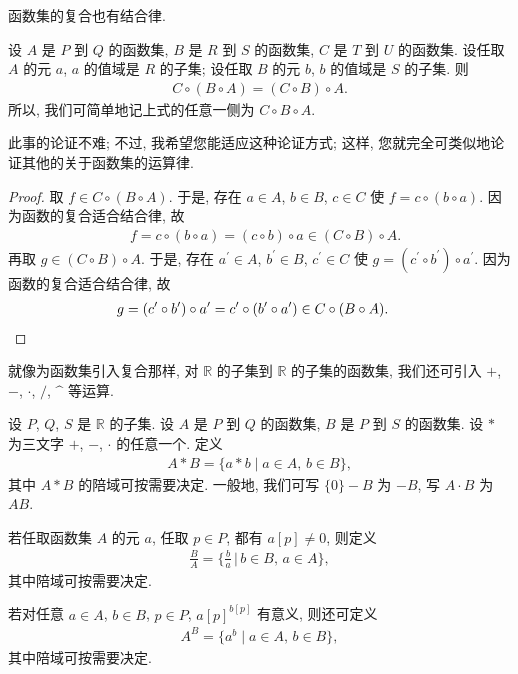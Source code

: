 函数集的复合也有结合律.

\begin{theorem}
    设 $A$ 是 $P$ 到 $Q$ 的函数集,
    $B$ 是 $R$ 到 $S$ 的函数集,
    $C$ 是 $T$ 到 $U$ 的函数集.
    设任取 $A$ 的元 $a$, $a$ 的值域是 $R$ 的子集;
    设任取 $B$ 的元 $b$, $b$ 的值域是 $S$ 的子集.
    则
    \begin{align*}
        C \circ (B \circ A) = (C \circ B) \circ A.
    \end{align*}
    所以, 我们可简单地记上式的任意一侧为 $C \circ B \circ A$.
\end{theorem}

此事的论证不难;
不过, 我希望您能适应这种论证方式;
这样, 您就完全可类似地论证其他的关于函数集的运算律.

\begin{proof}
    取 $f \in C \circ (B \circ A)$.
    于是, 存在 $a \in A$, $b \in B$, $c \in C$
    使 $f = c \circ (b \circ a)$.
    因为函数的复合适合结合律, 故
    \begin{align*}
         & f = c \circ (b \circ a) = (c \circ b) \circ a \in (C \circ B) \circ A.
    \end{align*}
    再取 $g \in (C \circ B) \circ A$.
    于是, 存在
    $a^{\prime} \in A$, $b^{\prime} \in B$, $c^{\prime} \in C$
    使 $g = (c^{\prime} \circ b^{\prime}) \circ a^{\prime}$.
    因为函数的复合适合结合律, 故
    \begin{align*}
         & g = (c^{\prime} \circ b^{\prime}) \circ a^{\prime} = c^{\prime} \circ (b^{\prime} \circ a^{\prime}) \in C \circ (B \circ A). \qedhere
    \end{align*}
\end{proof}

就像为函数集引入复合那样,
对 $\mathbb{R}$ 的子集到 $\mathbb{R}$ 的子集的函数集,
我们还可引入
$+$, $-$, $\cdot$, $/$, $\text{\textasciicircum}$
等运算.

\begin{definition}
    设 $P$, $Q$, $S$ 是 $\mathbb{R}$ 的子集.
    设 $A$ 是 $P$ 到 $Q$ 的函数集,
    $B$ 是 $P$ 到 $S$ 的函数集.
    设 $\ast$ 为三文字 $+$, $-$, $\cdot$ 的任意一个.
    定义
    \begin{align*}
        A \ast B = \{ a \ast b \mid \text{$a \in A$, $b \in B$} \},
    \end{align*}
    其中 $A \ast B$ 的陪域可按需要决定.
    一般地, 我们可写 $\{ 0 \} - B$ 为 $-B$,
    写 $A \cdot B$ 为 $AB$.

    若任取函数集 $A$ 的元 $a$,
    任取 $p \in P$, 都有 $a[p] \neq 0$,
    则定义
    \begin{align*}
        \frac{B}{A} = \Bigg\{ \frac{b}{a} \,\Bigg|\,  \text{$b \in B$, $a \in A$} \Bigg\},
    \end{align*}
    其中陪域可按需要决定.

    若对任意 $a \in A$, $b \in B$, $p \in P$,
    ${a[p]}^{b[p]}$ 有意义, 则还可定义
    \begin{align*}
        A^B = \{ a^b \mid \text{$a \in A$, $b \in B$} \},
    \end{align*}
    其中陪域可按需要决定.
\end{definition}

